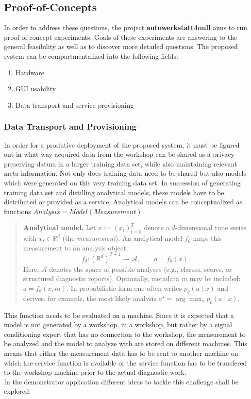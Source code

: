 \documentclass[conference,a4paper]{IEEEtran}
\begin{document}
\subsection{Proof-of-Concepts}
In order to address these questions, the project \textbf{autowerkstatt4null} aims to run proof of concept experiments.
Goals of these experiments are answering to the general feasibility as well as to discover more detailed questions.
The proposed system can be compartmentalized into the following fields:
\begin{enumerate}
  \item Hardware
  \item GUI usability
  \item Data transport and service provisioning 
\end{enumerate}

\subsubsection{Data Transport and Provisioning}
In order for a produtive deployment of the proposed system, it must be figured out in what way acquired data from the workshop can be shared as a privacy preserving datum in a larger training data set, while also maintaining relevant meta information.
Not only does training data need to be shared but also models which were generated on this very training data set.
In succession of generating training data set and distilling analytical models, these models have to be distributed or provided as a service.
Analytical models can be conceptualized as functions $Analysis = Model(Measurement)$.
\begin{quote}
\textbf{Analytical model.}  
Let $x := (x_t)_{t=0}^{T}$ denote a $d$-dimensional time series with $x_t \in \mathbb{R}^d$ (the \emph{measurement}).  
An analytical model $f_\theta$ maps this measurement to an analysis object:
\[
f_\theta : (\mathbb{R}^d)^{T+1} \to \mathcal{A}, \qquad a = f_\theta(x).
\]
Here, $\mathcal{A}$ denotes the space of possible analyses (e.g., classes, scores, or structured diagnostic reports).  
Optionally, metadata $m$ may be included: $a = f_\theta(x, m)$.  
In probabilistic form one often writes $p_\theta(a \mid x)$ and derives, for example, the most likely analysis 
$a^\star = \arg\max_a p_\theta(a \mid x)$.
\end{quote}
This function needs to be evaluated on a machine.
Since it is expected that a model is not generated by a workshop, in a workshop, but rather by a signal conditioning expert that has no connection to the workshop, the measurement to be analyzed and the model to analyze with are stored on different machines.
This means that either the measurement data has to be sent to another machine on which the service function is available or the service function has to be transfered to the workshop machine prior to the actual diagnostic work. \hfill \\
In the demonstrator application different ideas to tackle this challenge shall be explored. 
\end{document}
